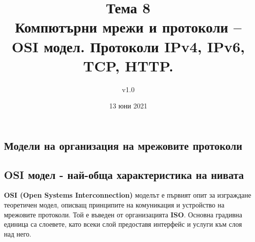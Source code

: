 \documentclass[fleqn,12pt]{article}
\title{Тема 8\\ Компютърни мрежи и протоколи – OSI модел. Протоколи IPv4,  IPv6, TCP, HTTP.}
\author{v1.0}
\date{13 юни 2021}
\begin{document}
\maketitle

\tableofcontents
\pagebreak

\begin{flushleft}

\section{Модели на организация на мрежовите протоколи}
\subsection{OSI модел - най-обща характеристика на нивата}
\textbf{OSI (Open Systems Interconnection)} моделът е първият опит за изграждане теоретичен модел, описващ принципите на комуникация и устройство на мрежовите протоколи.
Той е въведен от организацията \textbf{ISO}. Основна градивна единица са слоевете, като всеки слой предоставя интерфейс и услуги към слоя над него.


\end{flushleft}
\end{document}
